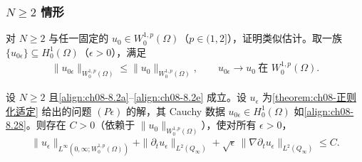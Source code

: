 \documentclass[../../main.tex]{subfiles}%
\begin{document}
\subsubsection{$N\geqslant2$ 情形}\label{subsubsection:ch08-N2估计}

对 $N\geqslant2$ 与任一固定的 $u_0\in W^{1,p}_0(\Omega)$（$p\in(1,2]$），证明类似估计。取一族 $\{u_{0\epsilon}\}\subseteq H^1_0(\Omega)$（$\epsilon>0$），满足
\begin{align}
\|u_{0\epsilon}\|_{W^{1,p}_0(\Omega)}\leqslant\|u_0\|_{W^{1,p}_0(\Omega)},\qquad
u_{0\epsilon}\to u_0\ \text{在 }W^{1,p}_0(\Omega). \label{align:ch08-8.28}
\end{align}

\begin{proposition}\label{proposition:ch08-先验估计N2}
设 $N\geqslant2$ 且\eqref{align:ch08-8.2a}--\eqref{align:ch08-8.2e} 成立。设 $u_\epsilon$ 为\cref{theorem:ch08-正则化适定} 给出的问题 $(P\epsilon)$ 的解，其 Cauchy 数据 $u_{0\epsilon}\in H^1_0(\Omega)$ 如\eqref{align:ch08-8.28}。则存在 $C>0$（依赖于 $\|u_0\|_{W^{1,p}_0(\Omega)}$），使对所有 $\epsilon>0$，
\begin{align}
\|u_\epsilon\|_{L^\infty(0,\infty;W^{1,p}_0(\Omega))}
+\|\partial_t u_\epsilon\|_{L^2(Q_\infty)}
+\sqrt{\epsilon}\,\|\nabla\partial_t u_\epsilon\|_{L^2(Q_\infty)}\leqslant C. \label{align:ch08-8.29}
\end{align}
\end{proposition}
\end{document}
